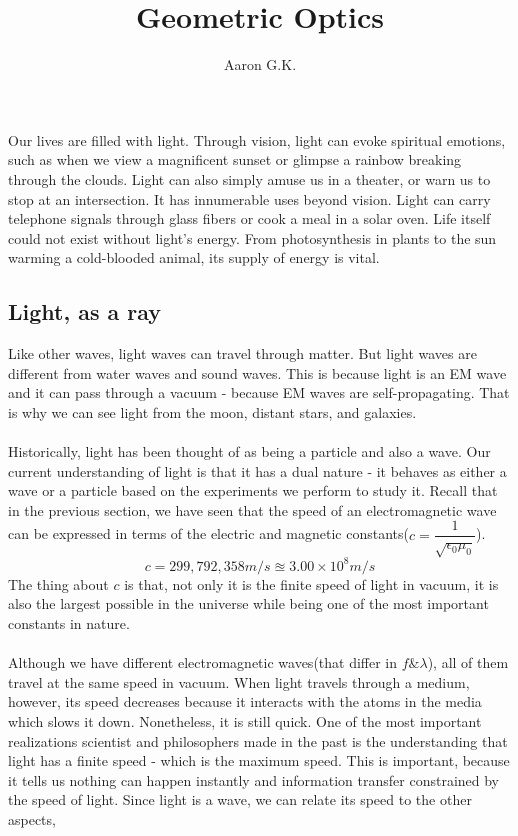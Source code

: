 \documentclass[11pt]{article}
\title{Geometric Optics}
\author{Aaron G.K.}
\begin{document}
	\maketitle
	Our lives are filled with light. Through vision, light can evoke spiritual emotions, such as when we view a magnificent sunset or glimpse a rainbow breaking through the clouds. Light can also simply amuse us in a theater, or warn us to stop at an intersection. It has innumerable uses beyond vision. Light can carry telephone signals through glass fibers or cook a meal in a solar oven. Life itself could not exist without light’s energy. From photosynthesis in plants to the sun warming a cold-blooded animal, its supply of energy is vital.
	\subsection*{Light, as a ray}
	Like other waves, light waves can travel through matter. But light waves are different from water waves and sound waves. This is because light is an EM wave and it can pass through a vacuum - because EM waves are self-propagating. That is why we can see light from the moon, distant stars, and galaxies. \\ \\
	Historically, light has been thought of as being a particle and also a wave. Our current understanding of light is that it has a dual nature - it behaves as either a wave or a particle based on the experiments we perform to study it. Recall that in the previous section, we have seen that the speed of an electromagnetic wave can be expressed in terms of the electric and magnetic constants($c=\dfrac{1}{\sqrt{\epsilon_0\mu_0}}$).
	$$c=299,792,358m/s\approxeq3.00\times10^8m/s$$
	The thing about $c$ is that, not only it is the finite speed of light in vacuum, it is also the largest possible in the universe while being one of the most important constants in nature. \\ \\
	Although we have different electromagnetic waves(that differ in $f\&\lambda$), all of them travel at the same speed in vacuum. When light travels through a medium, however, its speed decreases because it interacts with the atoms in the media which slows it down. Nonetheless, it is still quick. One of the most important realizations scientist and philosophers made in the past is the understanding that light has a finite speed - which is the maximum speed. This is important, because it tells us nothing can happen instantly and information transfer constrained by the speed of light. Since light is a wave, we can relate its speed to the other aspects,
\end{document}
